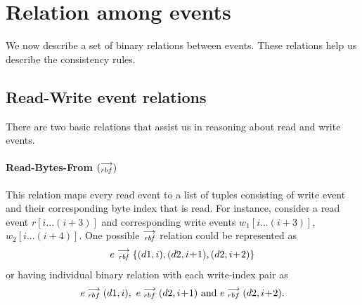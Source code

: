     \section{Relation among events}
        We now describe a set of binary relations between events. These relations help us describe the consistency rules.
        
        \subsection{Read-Write event relations}
            There are two basic relations that assist us in reasoning about read and write events.

            \paragraph{Read-Bytes-From $(\stackrel{\longrightarrow}{_{rbf}})$}
            This relation maps every read event to a list of tuples consisting of write event and their corresponding byte index that is read. For instance, consider a read event $r[i...(i+3)]$ and corresponding write events $w_1[i...(i+3)]$, $w_2[i...(i+4)]$. One possible $\stackrel{\longrightarrow}{_\textit{rbf}}$ relation could be represented as  
                \begin{align*}
                    e\stackrel{\longrightarrow}{_{\textit{rbf}}}\{(d1, i), (d2, i\!+\!1), (d2, i\!+\!2)\}     
                \end{align*}   
            or having individual binary relation with each write-index pair as 
            \begin{align*}
                e\stackrel{\longrightarrow}{_{rbf}}(d1, i),\ e\stackrel{\longrightarrow}{_{rbf}}(d2, i\!+\!1)  \text{ and } e\stackrel{\longrightarrow}{_{rbf}}(d2, i\!+\!2).
            \end{align*}
            
